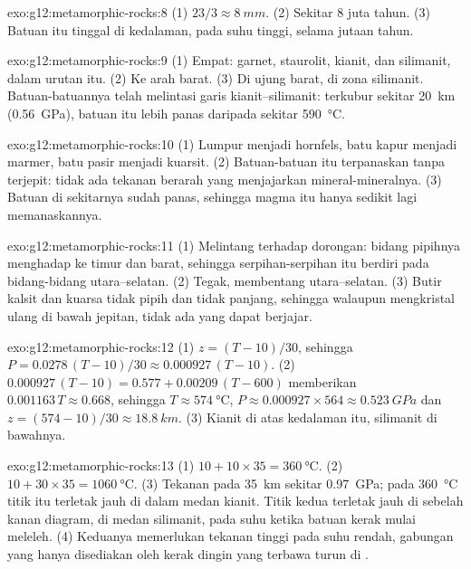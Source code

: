 \begin{solution}{exo:g12:metamorphic-rocks:8}
(1) $23/3 \approx \qty{8}{mm}$. (2) Sekitar 8 juta tahun. (3) Batuan itu
tinggal di kedalaman, pada suhu tinggi, selama jutaan tahun.
\end{solution}

\begin{solution}{exo:g12:metamorphic-rocks:9}
(1) Empat:  garnet, staurolit, kianit, dan silimanit, dalam urutan itu.
(2) Ke arah barat. (3) Di ujung barat, di zona silimanit. Batuan-batuannya
telah melintasi garis kianit--silimanit: terkubur sekitar \qty{20}{km}
(\qty{0.56}{GPa}), batuan itu lebih panas daripada sekitar \qty{590}{\celsius}.
\end{solution}

\begin{solution}{exo:g12:metamorphic-rocks:10}
(1) Lumpur menjadi hornfels, batu kapur menjadi marmer, batu pasir menjadi
kuarsit. (2) Batuan-batuan itu terpanaskan tanpa terjepit: tidak ada tekanan
berarah yang menjajarkan mineral-mineralnya. (3) Batuan di sekitarnya sudah
panas, sehingga magma itu hanya sedikit lagi memanaskannya.
\end{solution}

\begin{solution}{exo:g12:metamorphic-rocks:11}
(1) Melintang terhadap dorongan: bidang pipihnya menghadap ke timur dan barat,
sehingga serpihan-serpihan itu berdiri pada bidang-bidang utara--selatan.
(2) Tegak, membentang utara--selatan. (3) Butir kalsit dan kuarsa tidak pipih
dan tidak panjang, sehingga walaupun mengkristal ulang di bawah jepitan, tidak
ada yang dapat berjajar.
\end{solution}

\begin{solution}{exo:g12:metamorphic-rocks:12}
(1) $z = (T - 10)/30$, sehingga $P = 0.0278\,(T - 10)/30 \approx
0.000927\,(T - 10)$. (2) $0.000927\,(T - 10) = 0.577 + 0.00209\,(T - 600)$
memberikan $0.001163\,T \approx 0.668$, sehingga $T \approx \qty{574}{\celsius}$, $P
\approx 0.000927 \times 564 \approx \qty{0.523}{GPa}$ dan $z = (574 - 10)/30
\approx \qty{18.8}{km}$. (3) Kianit di atas kedalaman itu, silimanit di
bawahnya.
\end{solution}

\begin{solution}{exo:g12:metamorphic-rocks:13}
(1) $10 + 10 \times 35 = \qty{360}{\celsius}$. (2) $10 + 30 \times 35 =
\qty{1060}{\celsius}$. (3) Tekanan pada \qty{35}{km} sekitar
\qty{0.97}{GPa}; pada \qty{360}{\celsius} titik itu terletak jauh di dalam
medan kianit. Titik kedua terletak jauh di sebelah kanan diagram, di medan
silimanit, pada suhu ketika batuan kerak mulai meleleh. (4) Keduanya memerlukan
tekanan tinggi pada suhu rendah, gabungan yang hanya disediakan oleh kerak
dingin yang terbawa turun di .
\end{solution}

